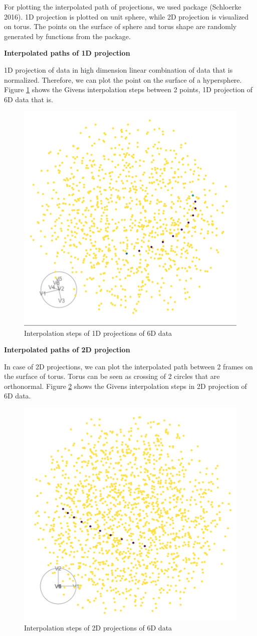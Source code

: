 For plotting the interpolated path of projections, we used  package (Schloerke 2016). 1D projection is plotted on unit sphere, while 2D projection is visualized on torus. The points on the surface of sphere and torus shape are randomly generated by functions from the  package.

\textbf{Interpolated paths of 1D projection}

1D projection of data in high dimension linear combination of data that is normalized. Therefore, we can plot the point on the surface of a hypersphere. Figure \ref{fig:1d-path-static} shows the Givens interpolation steps between 2 points, 1D projection of 6D data that is.

\begin{figure}

{\centering \includegraphics[width=0.5\linewidth]{sphere_static} 

}

\caption{Interpolation steps of 1D projections of 6D data}\label{fig:1d-path-static}
\end{figure}

\textbf{Interpolated paths of 2D projection}

In case of 2D projections, we can plot the interpolated path between 2 frames on the surface of torus. Torus can be seen as crossing of 2 circles that are orthonormal. Figure \ref{fig:2d-path-static} shows the Givens interpolation steps in 2D projection of 6D data.

\begin{figure}

{\centering \includegraphics[width=0.5\linewidth]{torus_static} 

}

\caption{Interpolation steps of 2D projections of 6D data}\label{fig:2d-path-static}
\end{figure}

